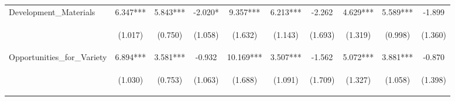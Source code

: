 \begin{tabular}{lccccccccc}
\noalign{\smallskip}Development\_Materials & 6.347*** & 5.843*** & -2.020* & 9.357*** & 6.213*** & -2.262 & 4.629*** & 5.589*** & -1.899\\
 & \begin{footnotesize}(1.017)\end{footnotesize} & \begin{footnotesize}(0.750)\end{footnotesize} & \begin{footnotesize}(1.058)\end{footnotesize} & \begin{footnotesize}(1.632)\end{footnotesize} & \begin{footnotesize}(1.143)\end{footnotesize} & \begin{footnotesize}(1.693)\end{footnotesize} & \begin{footnotesize}(1.319)\end{footnotesize} & \begin{footnotesize}(0.998)\end{footnotesize} & \begin{footnotesize}(1.360)\end{footnotesize}\\
\noalign{\smallskip}Opportunities\_for\_Variety & 6.894*** & 3.581*** & -0.932 & 10.169*** & 3.507*** & -1.562 & 5.072*** & 3.881*** & -0.870\\
 & \begin{footnotesize}(1.030)\end{footnotesize} & \begin{footnotesize}(0.753)\end{footnotesize} & \begin{footnotesize}(1.063)\end{footnotesize} & \begin{footnotesize}(1.688)\end{footnotesize} & \begin{footnotesize}(1.091)\end{footnotesize} & \begin{footnotesize}(1.709)\end{footnotesize} & \begin{footnotesize}(1.327)\end{footnotesize} & \begin{footnotesize}(1.058)\end{footnotesize} & \begin{footnotesize}(1.398)\end{footnotesize}\\

\end{tabular}
